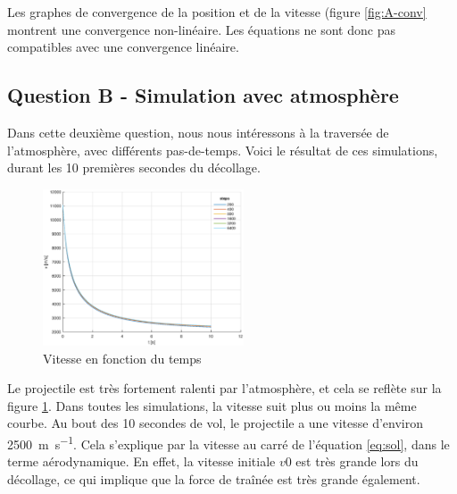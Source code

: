 \documentclass[a4paper,12pt,twoside]{article}
\begin{document}
Les graphes de convergence de la position et de la vitesse (figure \ref{fig:A-conv} montrent une convergence non-linéaire. Les équations ne sont donc pas compatibles avec une convergence linéaire.

\subsection{Question B - Simulation avec atmosphère}
Dans cette deuxième question, nous nous intéressons à la traversée de l'atmosphère, avec différents pas-de-temps. Voici le résultat de ces simulations, durant les 10 premières secondes du décollage.\\

\begin{figure}[h]
	\centering
    \includegraphics[width=0.53\textwidth]{graphs/vB.eps}
    \caption{Vitesse en fonction du temps}
    \label{fig:B-vt}
\end{figure}

Le projectile est très fortement ralenti par l'atmosphère, et cela se reflète sur la figure \ref{fig:B-vt}. Dans toutes les simulations, la vitesse suit plus ou moins la même courbe. Au bout des 10 secondes de vol, le projectile a une vitesse d'environ \SI{2500}{\meter\per\second}. Cela s'explique par la vitesse au carré de l'équation \ref{eq:sol}, dans le terme aérodynamique. En effet, la vitesse initiale $v0$ est très grande lors du décollage, ce qui implique que la force de traînée est très grande également.\\

\end{document}
